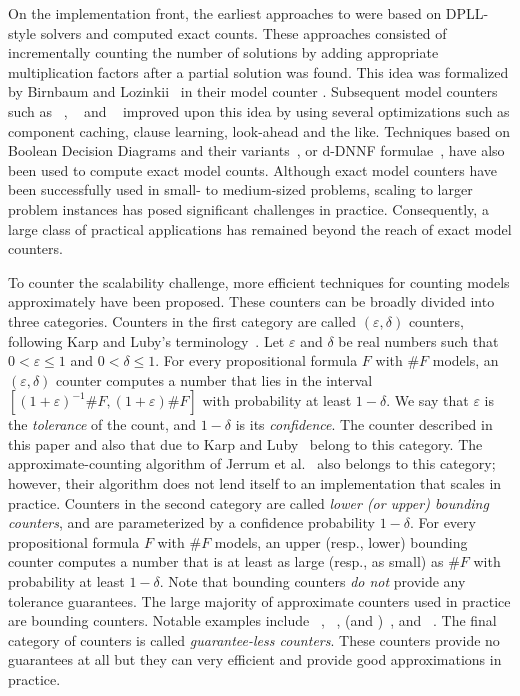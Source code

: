 On the implementation front, the earliest approaches to {\sharpSAT}
were based on DPLL-style {\SAT} solvers and computed exact counts.
These approaches consisted of incrementally counting the number of
solutions by adding appropriate multiplication factors after a partial
solution was found.  This idea was formalized by Birnbaum and
Lozinkii~\cite {Birnbaum1999} in their model counter {\CDP}.  Subsequent
model counters such as {\Relsat}~\cite{Bayardo97usingcsp},
{\Cachet}~\cite{Sang04combiningcomponent} and
{\sharpSATTool}~\cite{Thurley2006} improved upon this idea by using
several optimizations such as component caching, clause learning,
look-ahead and the like.  Techniques based on Boolean Decision
Diagrams and their variants~\cite{minato93,lobbing1996}, or d-DNNF
formulae~\cite{darwiche2004new}, have also been used to compute exact
model counts.  Although exact model counters have been successfully
used in small- to medium-sized problems, scaling to larger problem
instances has posed significant challenges in practice.  Consequently,
a large class of practical applications has remained beyond the reach
of exact model counters.

To counter the scalability challenge, more efficient techniques for
counting models approximately have been proposed.  These counters can
be broadly divided into three categories.  Counters in the first
category are called $(\varepsilon, \delta)$ counters, following Karp
and Luby's terminology~\cite{KarpLuby1989}.  Let $\varepsilon$ and
$\delta$ be real numbers such that $ 0 < \varepsilon \leq 1$ and $0 <
\delta \le 1$.  For every propositional formula $F$ with $\#F$ models,
an $(\varepsilon, \delta)$ counter computes a number that lies in the
interval $[(1+\varepsilon)^{-1}\#F, (1+\varepsilon)\#F]$ with
probability at least $1-\delta$.  We say that $\varepsilon$ is the
\emph{tolerance} of the count, and $1-\delta$ is its
\emph{confidence}.  The counter described in this paper and also that
due to Karp and Luby~\cite{KarpLuby1989} belong to this category.  The
approximate-counting algorithm of Jerrum et al.~\cite{Jerr} also
belongs to this category; however, their algorithm does not lend
itself to an implementation that scales in practice.  Counters in the
second category are called \emph{lower (or upper) bounding counters},
and are parameterized by a confidence probability $1-\delta$.  For every
propositional formula $F$ with $\#F$ models, an upper (resp., lower)
bounding counter computes a number that is at least as large (resp.,
as small) as $\#F$ with probability at least $1 - \delta$.  Note that
bounding counters \emph{do not} provide any tolerance guarantees.  The
large majority of approximate counters used in practice are bounding
counters.  Notable examples include
{\SampleCount}~\cite{gomes2007sampling},
{\BPCount}~\cite{KrocSabSel2008}, {\MBound} (and
{\HybridMBound})~\cite{gomes2006model}, and
{\MiniCount}~\cite{KrocSabSel2008}.  The final category of counters is
called \emph{guarantee-less counters}.  These counters provide no
guarantees at all but they can  very efficient and provide good
approximations in practice.  

